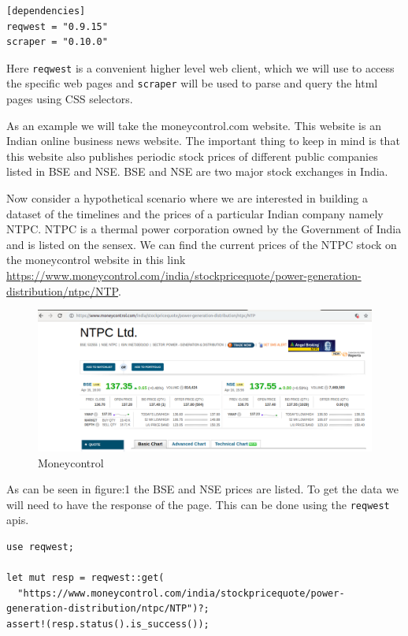 \documentclass{book}
\begin{document}
\begin{lstlisting}[caption={chapter4\\/working\_with\_data\\/scraping\\/Cargo\\.toml},basicstyle=\small]
[dependencies]
reqwest = "0.9.15"
scraper = "0.10.0"
\end{lstlisting}

Here \lstinline{reqwest} is a convenient higher level web client, which we will use to access the specific web pages and \lstinline{scraper} will be used to parse and query the html pages using CSS selectors.

As an example we will take the moneycontrol.com website. This website is an Indian online business news website. The important thing to keep in mind is that this website also publishes periodic stock prices of different public companies listed in BSE and NSE. BSE and NSE are two major stock exchanges in India.

Now consider a hypothetical scenario where we are interested in building a dataset of the timelines and the prices of a particular Indian company namely NTPC. NTPC is a thermal power corporation owned by the Government of India and is listed on the sensex. We can find the current prices of the NTPC stock on the moneycontrol website in this link \href{money control NTPC}{https://www.moneycontrol.com/india/stockpricequote/power-generation-distribution/ntpc/NTP}.

\begin{figure}[htpb]
	\centering
	\includegraphics[width=0.8\linewidth]{moneycontrol_ntpc.png}
	\caption{Moneycontrol}
	\label{fig:moneycontrol}
\end{figure}

As can be seen in figure:1 the BSE and NSE prices are listed. To get the data we will need to have the response of the page. This can be done using the \lstinline{reqwest} apis.

\begin{lstlisting}[caption={chapter4\\/working\_with\_data\\/scraping\\/src\\/main\\.toml},basicstyle=\small]
use reqwest;

let mut resp = reqwest::get(
  "https://www.moneycontrol.com/india/stockpricequote/power-generation-distribution/ntpc/NTP")?;
assert!(resp.status().is_success());
\end{lstlisting}
\end{document}
